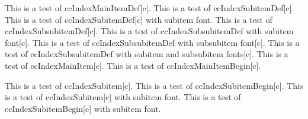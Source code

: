 \documentclass{article}
\begin{document}
{{{{%
This is a test of ccIndexMainItemDef[c].
This is a test of ccIndexSubitemDef[c].
This is a test of ccIndexSubitemDef[c] with subitem font.
This is a test of ccIndexSubsubitemDef[c].
This is a test of ccIndexSubsubitemDef with subitem font[c].
This is a test of ccIndexSubsubitemDef with subsubitem font[c].
This is a test of ccIndexSubsubitemDef with subitem and subsubitem fonts[c].
\pagebreak
This is a test of ccIndexMainItem[c].
This is a test of ccIndexMainItemBegin[c].

This is a test of ccIndexSubitem[c].
This is a test of ccIndexSubitemBegin[c].
This is a test of ccIndexSubitem[c] with subitem font.
This is a test of ccIndexSubitemBegin[c] with subitem font.

}}}}
\end{document}
